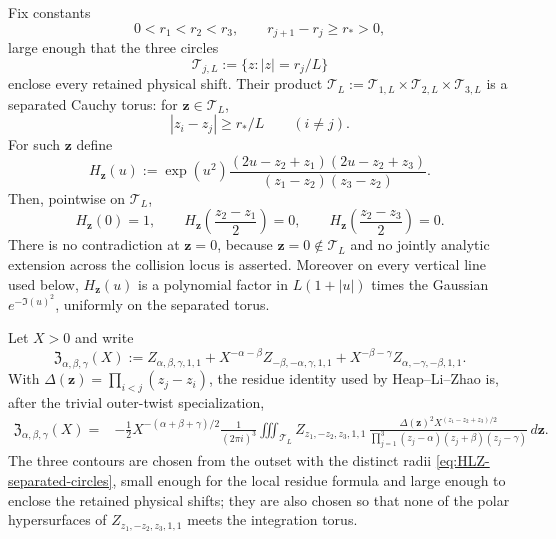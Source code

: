 Fix constants
\[
0<r_1<r_2<r_3,
\qquad
r_{j+1}-r_j\ge r_*>0,
\]
large enough that the three circles
\begin{equation}
\mathcal T_{j,L}:=\{z:|z|=r_j/L\}
\label{eq:HLZ-separated-circles}
\end{equation}
enclose every retained physical shift.  Their product
$\mathcal T_L:=\mathcal T_{1,L}\times\mathcal T_{2,L}\times\mathcal T_{3,L}$
is a separated Cauchy torus: for $\mathbf z\in\mathcal T_L$,
\begin{equation}
|z_i-z_j|\ge r_*/L\qquad(i\ne j).
\label{eq:HLZ-shift-separation}
\end{equation}
For such $\mathbf z$ define
\begin{equation}
\boxed{
H_{\mathbf z}(u):=
\exp(u^2)
\frac{(2u-z_2+z_1)(2u-z_2+z_3)}
     {(z_1-z_2)(z_3-z_2)}.
}
\label{eq:HLZ-explicit-auxiliary}
\end{equation}
Then, pointwise on $\mathcal T_L$,
\begin{equation}
H_{\mathbf z}(0)=1,
\qquad
H_{\mathbf z}\!\left(\frac{z_2-z_1}{2}\right)=0,
\qquad
H_{\mathbf z}\!\left(\frac{z_2-z_3}{2}\right)=0.
\label{eq:HLZ-auxiliary-properties}
\end{equation}
There is no contradiction at $\mathbf z=0$, because
$\mathbf z=0\notin\mathcal T_L$ and no jointly analytic extension across the
collision locus is asserted.  Moreover on every vertical line used below,
$H_{\mathbf z}(u)$ is a polynomial factor in $L(1+|u|)$ times the Gaussian
$e^{-\Im(u)^2}$, uniformly on the separated torus.

\begin{proposition}
\label{prop:HLZ-three-face-Cauchy}
Let $X>0$ and write
\[
\mathfrak Z_{\alpha,\beta,\gamma}(X)
:=Z_{\alpha,\beta,\gamma,1,1}
+X^{-\alpha-\beta}Z_{-\beta,-\alpha,\gamma,1,1}
+X^{-\beta-\gamma}Z_{\alpha,-\gamma,-\beta,1,1}.
\]
With $\Delta(\mathbf z)=\prod_{i<j}(z_j-z_i)$, the residue identity used by
Heap--Li--Zhao is, after the trivial outer-twist specialization,
\begin{equation}
\boxed{
\begin{aligned}
\mathfrak Z_{\alpha,\beta,\gamma}(X)
={}&-\frac12X^{-(\alpha+\beta+\gamma)/2}
\frac1{(2\pi i)^3}
\iiint_{\mathcal T_L}
Z_{z_1,-z_2,z_3,1,1}\,
\frac{\Delta(\mathbf z)^2
X^{(z_1-z_2+z_3)/2}}
{\prod_{j=1}^3(z_j-\alpha)(z_j+\beta)(z_j-\gamma)}
\,d\mathbf z .
\end{aligned}}
\label{eq:HLZ-three-face-Cauchy}
\end{equation}
The three contours are chosen from the outset with the distinct radii
\eqref{eq:HLZ-separated-circles}, small enough for the local residue formula
and large enough to enclose the retained physical shifts; they are also chosen
so that none of the polar hypersurfaces of
$Z_{z_1,-z_2,z_3,1,1}$ meets the integration torus.
\end{proposition}

